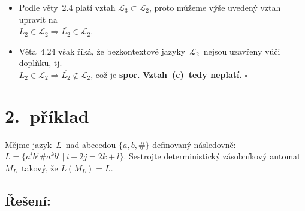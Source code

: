 \documentclass[a4paper, 11pt]{scrartcl}
\newcommand*{\QEDB}{\hfill\ensuremath{\square}}
\begin{document}
\begin{enumerate}[(a)]
\begin{itemize}
                \item
                    Podle věty~2.4 platí vztah $ \mathcal{L}_3
                    \subset \mathcal{L}_2 $, proto můžeme výše uvedený vztah
                    upravit na \\ $ L_2 \in \mathcal{L}_2 \Rightarrow
                    \overline{L_2} \in \mathcal{L}_2 $.

                \item
                    Věta~4.24 však říká, že bezkontextové
                    jazyky~$ \mathcal{L}_2 $~nejsou uzavřeny vůči doplňku,
                    tj. \\ $ L_2 \in \mathcal{L}_2 \Rightarrow \overline{L_2}
                    \notin \mathcal{L}_2 $, což je \textbf{spor}.
                    \textbf{Vztah~(c)~tedy neplatí.} \QEDB
            \end{itemize}
    \end{enumerate}


    \section*{2.~příklad}

    Mějme jazyk~$ L $~nad abecedou $ \{a, b, \#\} $ definovaný následovně:
    $ L = \{a^ib^j\#a^kb^l\ |\ i + 2j = 2k + l\} $. Sestrojte deterministický
    zásobníkový automat~$ M_L $~takový, že $ L(M_L) = L $.

    \subsection*{Řešení:}
\end{document}
